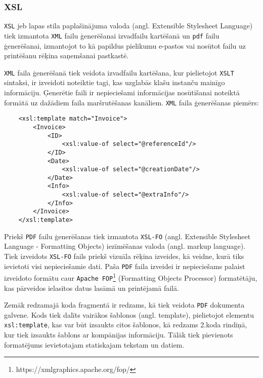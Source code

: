 \subsubsection{XSL}
\par \texttt{XSL} jeb lapas stila paplašinājuma valoda (angl. Extensible Stylesheet Language) tiek izmantota \texttt{XML} failu ģenerēšanai izvadfailu kartēšanā un  \texttt{pdf} failu ģenerēšanai, izmantojot to kā papildus pielikumu e-pastos vai nosūtot failu uz printēšanu rēķina saņemšanai pastkastē.
\par \texttt{XML} faila ģenerēšanā tiek veidota izvadfailu kartēšana, kur pielietojot \texttt{XSLT} sintaksi, ir izveidoti noteiktie tagi, kas uzglabās klašu instanču mainīgo informāciju. Ģenerētie faili ir nepieciešami informācijas nosūtīšanai noteiktā formātā uz dažādiem faila maršrutēšanas kanāliem. \texttt{XML} faila ģenerēšanas piemērs:

{
\begin{verbatim}
    <xsl:template match="Invoice">
        <Invoice>
            <ID>
                <xsl:value-of select="@referenceId"/>
            </ID>
            <Date>
                <xsl:value-of select="@creationDate"/>
            </Date>
            <Info>
                <xsl:value-of select="@extraInfo"/>
            </Info>
        </Invoice>
    </xsl:template>
\end{verbatim}
}

\par Priekš \texttt{PDF} failu ģenerēšanas tiek izmantota \texttt{XSL-FO} (angl. Extensible Stylesheet Language - Formatting Objects) iezīmēšanas valoda (angl. markup language). Tiek izveidots \texttt{XSL-FO} fails priekš vizuāla rēķina izveides, kā veidne, kurā tiks ievietoti visi nepieciešamie dati. Paša \texttt{PDF} faila izveidei ir nepieciešams palaist izveidoto formātu caur \texttt{Apache FOP}\footnote{https://xmlgraphics.apache.org/fop/} (Formatting Objects Processor) formatētāju, kas pārveidos ielasītos datus lasāmā un printējamā failā.
\par Zemāk redzamajā koda fragmentā ir redzams, kā tiek veidota \texttt{PDF} dokumenta galvene. Kods tiek dalīts vairākos šablonos (angl. template), pielietojot elementu \texttt{xsl:template}, kas var būt izsaukts citos šablonos, kā redzams 2.koda rindiņā, kur tiek izsaukts šablons ar kompānijas informāciju. Tālāk tiek pievienots formatējums ievietotajam statiskajam tekstam un datiem.

